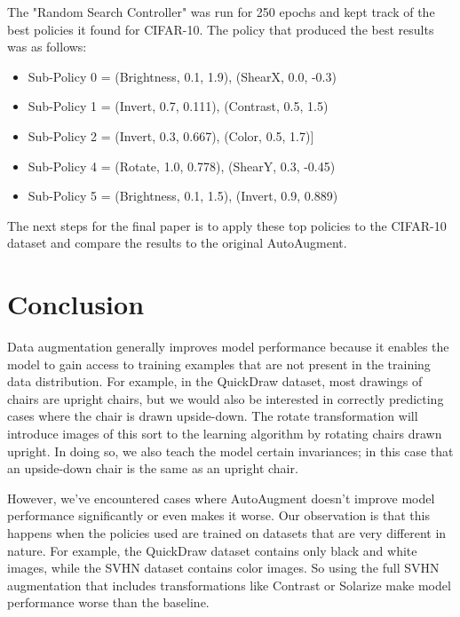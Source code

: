 \documentclass[10pt,twocolumn,letterpaper]{article}
\begin{document}
The "Random Search Controller" was run for 250 epochs and kept track of the best policies it found for CIFAR-10. The policy that produced the best results was as follows:

\begin{itemize}
  \item Sub-Policy 0 = (Brightness, 0.1, 1.9), (ShearX, 0.0, -0.3)
  \item Sub-Policy 1 = (Invert, 0.7, 0.111), (Contrast, 0.5, 1.5)
  \item Sub-Policy 2 = (Invert, 0.3, 0.667), (Color, 0.5, 1.7)]
  \item Sub-Policy 4 = (Rotate, 1.0, 0.778), (ShearY, 0.3, -0.45)
  \item Sub-Policy 5 = (Brightness, 0.1, 1.5), (Invert, 0.9, 0.889)
 
\end{itemize}

The next steps for the final paper is to apply these top policies to the CIFAR-10 dataset and compare the results to the original AutoAugment.



\section{Conclusion}

Data augmentation generally improves model performance because it enables the model to gain access to training examples that are not present in the training data distribution. For example, in the QuickDraw dataset, most drawings of chairs are upright chairs, but we would also be interested in correctly predicting cases where the chair is drawn upside-down. The rotate transformation will introduce images of this sort to the learning algorithm by rotating chairs drawn upright. In doing so, we also teach the model certain invariances; in this case that an upside-down chair is the same as an upright chair.

However, we’ve encountered cases where AutoAugment doesn’t improve model performance significantly or even makes it worse. Our observation is that this happens when the policies used are trained on datasets that are very different in nature. For example, the QuickDraw dataset contains only black and white images, while the SVHN dataset contains color images. So using the full SVHN augmentation that includes transformations like Contrast or Solarize make model performance worse than the baseline. 
\end{document}

